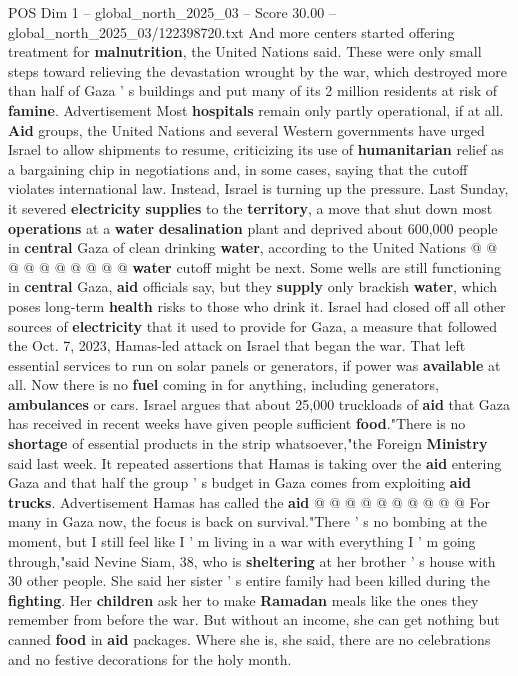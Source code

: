 \begin{textsample}{POS Dim 1 – global\_north\_2025\_03 – Score 30.00 – global\_north\_2025\_03/122398720.txt}
And more centers started offering treatment for \textbf{malnutrition}, the United Nations said.
These were only small steps toward relieving the devastation wrought by the war, which destroyed more than half of Gaza ' s buildings and put many of its 2 million residents at risk of \textbf{famine}.
Advertisement Most \textbf{hospitals} remain only partly operational, if at all. \textbf{Aid} groups, the United Nations and several Western governments have urged Israel to allow shipments to resume, criticizing its use of \textbf{humanitarian} relief as a bargaining chip in negotiations and, in some cases, saying that the cutoff violates international law.
Instead, Israel is turning up the pressure.
Last Sunday, it severed \textbf{electricity} \textbf{supplies} to the \textbf{territory}, a move that shut down most \textbf{operations} at a \textbf{water} \textbf{desalination} plant and deprived about 600,000 people in \textbf{central} Gaza of clean drinking \textbf{water}, according to the United Nations @ @ @ @ @ @ @ @ @ @ \textbf{water} cutoff might be next.
Some wells are still functioning in \textbf{central} Gaza, \textbf{aid} officials say, but they \textbf{supply} only brackish \textbf{water}, which poses long-term \textbf{health} risks to those who drink it.
Israel had closed off all other sources of \textbf{electricity} that it used to provide for Gaza, a measure that followed the Oct. 7, 2023, Hamas-led attack on Israel that began the war.
That left essential services to run on solar panels or generators, if power was \textbf{available} at all.
Now there is no \textbf{fuel} coming in for anything, including generators, \textbf{ambulances} or cars.
Israel argues that about 25,000 truckloads of \textbf{aid} that Gaza has received in recent weeks have given people sufficient \textbf{food}."There is no \textbf{shortage} of essential products in the strip whatsoever,"the Foreign \textbf{Ministry} said last week.
It repeated assertions that Hamas is taking over the \textbf{aid} entering Gaza and that half the group ' s budget in Gaza comes from exploiting \textbf{aid} \textbf{trucks}.
Advertisement Hamas has called the \textbf{aid} @ @ @ @ @ @ @ @ @ @ For many in Gaza now, the focus is back on survival."There ' s no bombing at the moment, but I still feel like I ' m living in a war with everything I ' m going through,"said Nevine Siam, 38, who is \textbf{sheltering} at her brother ' s house with 30 other people.
She said her sister ' s entire family had been killed during the \textbf{fighting}.
Her \textbf{children} ask her to make \textbf{Ramadan} meals like the ones they remember from before the war.
But without an income, she can get nothing but canned \textbf{food} in \textbf{aid} packages.
Where she is, she said, there are no celebrations and no festive decorations for the holy month.

\end{textsample}
